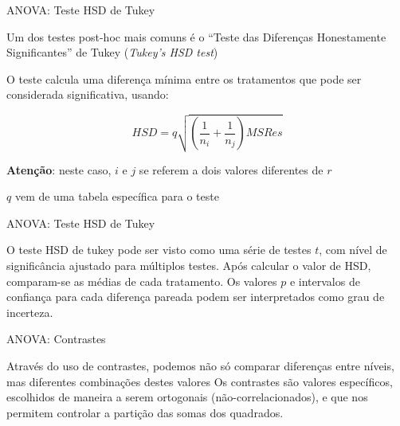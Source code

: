 \documentclass{beamer}\usepackage[]{graphicx}\usepackage[]{color}
\begin{document}
\begin{frame}{ANOVA: Teste HSD de Tukey}

Um dos testes post-hoc mais comuns é o ``Teste das Diferenças Honestamente Significantes'' de Tukey (\emph{Tukey's HSD test}) \pause
\vfill

O teste calcula uma diferença mínima entre os tratamentos que pode ser considerada significativa, usando:
\vfill

\begin{equation*}
HSD = q \sqrt{\left(\frac{1}{n_i}+\frac{1}{n_j}\right) MS{Res}}
\end{equation*}
\vfill 
\begin{scriptsize}
\textbf{Atenção}: neste caso, $i$ e $j$ se referem a dois valores diferentes de $r$
\end{scriptsize} \pause
\vfill
$q$ vem de uma tabela específica para o teste


\end{frame}

\begin{frame}{ANOVA: Teste HSD de Tukey}


O teste HSD de tukey pode ser visto como uma série de testes $t$, com nível de significância ajustado para múltiplos testes. \pause
\vfill
Após calcular o valor de HSD, comparam-se as médias de cada tratamento. \pause
\vfill
Os valores $p$ e intervalos de confiança para cada diferença pareada podem ser interpretados como grau de incerteza.

\end{frame}

\begin{frame}{ANOVA: Contrastes}

Através do uso de contrastes, podemos não só comparar diferenças entre níveis, mas diferentes combinações destes valores \pause
\vfill
Os contrastes são valores específicos, escolhidos de maneira a serem ortogonais (não-correlacionados), e que nos permitem controlar a partição das somas dos quadrados. \pause
\vfill

\end{frame}
\end{document}
